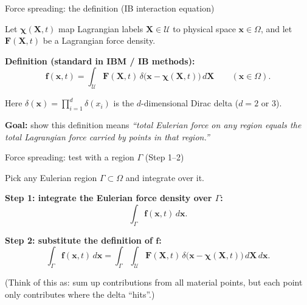 \documentclass{beamer}
\begin{document}
\begin{frame}{Force spreading: the definition (IB interaction equation)}
\footnotesize

Let $\boldsymbol{\chi}(\mathbf{X},t)$ map Lagrangian labels $\mathbf{X}\in\mathcal{U}$ to physical space
$\mathbf{x}\in\Omega$, and let $\mathbf{F}(\mathbf{X},t)$ be a Lagrangian force density.

\medskip
\textbf{Definition (standard in IBM / IB methods):}
\[
\boxed{
\mathbf{f}(\mathbf{x},t)
=
\int_{\mathcal{U}}
\mathbf{F}(\mathbf{X},t)\,
\delta\!\big(\mathbf{x}-\boldsymbol{\chi}(\mathbf{X},t)\big)\,d\mathbf{X}
}
\qquad (\mathbf{x}\in\Omega).
\]

\medskip
Here $\delta(\mathbf{x})=\prod_{i=1}^{d}\delta(x_i)$ is the $d$-dimensional Dirac delta ($d=2$ or $3$).

\medskip
\textbf{Goal:} show this definition means
\emph{“total Eulerian force on any region equals the total Lagrangian force carried by points in that region.”}
\end{frame}

\begin{frame}{Force spreading: test with a region $\Gamma$ (Step 1--2)}
\footnotesize

Pick any Eulerian region $\Gamma\subset\Omega$ and integrate over it.

\medskip
\textbf{Step 1: integrate the Eulerian force density over $\Gamma$:}
\[
\int_{\Gamma}\mathbf{f}(\mathbf{x},t)\,d\mathbf{x}.
\]

\medskip
\textbf{Step 2: substitute the definition of $\mathbf{f}$:}
\[
\int_{\Gamma}\mathbf{f}(\mathbf{x},t)\,d\mathbf{x}
=
\int_{\Gamma}\int_{\mathcal{U}}
\mathbf{F}(\mathbf{X},t)\,
\delta\!\big(\mathbf{x}-\boldsymbol{\chi}(\mathbf{X},t)\big)\,d\mathbf{X}\,d\mathbf{x}.
\]

\medskip
(Think of this as: sum up contributions from all material points, but each point only contributes where the delta “hits”.)
\end{frame}
\end{document}
